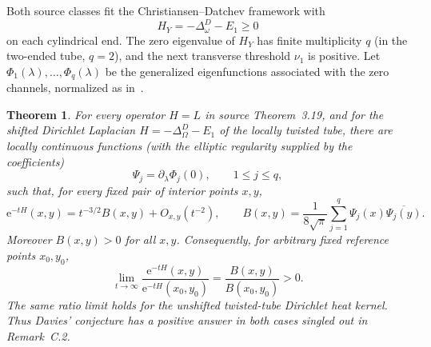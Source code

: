 \documentclass[11pt]{article}
\newtheorem{theorem}{Theorem}
\newcommand{\ee}{\mathrm e}
\begin{document}
Both source classes fit the Christiansen--Datchev framework with
\[
 H_Y=-\Delta^D_\omega-E_1\geq0
\]
on each cylindrical end.  The zero eigenvalue of \(H_Y\) has finite
multiplicity \(q\) (in the two-ended tube, \(q=2\)), and the next transverse
threshold \(\nu_1\) is positive.  Let
\(\Phi_1(\lambda),\ldots,\Phi_q(\lambda)\) be the generalized eigenfunctions
associated with the zero channels, normalized as in~\cite[Section~2.3]{CD}.

\begin{theorem}\label{thm:main}
For every operator \(H=L\) in source Theorem~3.19, and for the shifted
Dirichlet Laplacian \(H=-\Delta^D_\Omega-E_1\) of the locally twisted tube,
there are locally continuous functions (with the elliptic regularity supplied
by the coefficients)
\[
 \Psi_j=\partial_\lambda\Phi_j(0),\qquad 1\leq j\leq q,
\]
such that, for every fixed pair of interior points \(x,y\),
\begin{equation}\label{eq:asymptotic}
 \ee^{-tH}(x,y)
 =t^{-3/2}B(x,y)+O_{x,y}(t^{-2}),
 \qquad
 B(x,y)=\frac{1}{8\sqrt\pi}
 \sum_{j=1}^q\Psi_j(x)\overline{\Psi_j(y)}.
\end{equation}
Moreover \(B(x,y)>0\) for all \(x,y\).  Consequently, for arbitrary fixed
reference points \(x_0,y_0\),
\begin{equation}\label{eq:ratio}
 \lim_{t\to\infty}
 \frac{\ee^{-tH}(x,y)}{\ee^{-tH}(x_0,y_0)}
 =\frac{B(x,y)}{B(x_0,y_0)}>0.
\end{equation}
The same ratio limit holds for the unshifted twisted-tube Dirichlet heat
kernel.  Thus Davies' conjecture has a positive answer in both cases singled
out in Remark~C.2.
\end{theorem}
\end{document}
